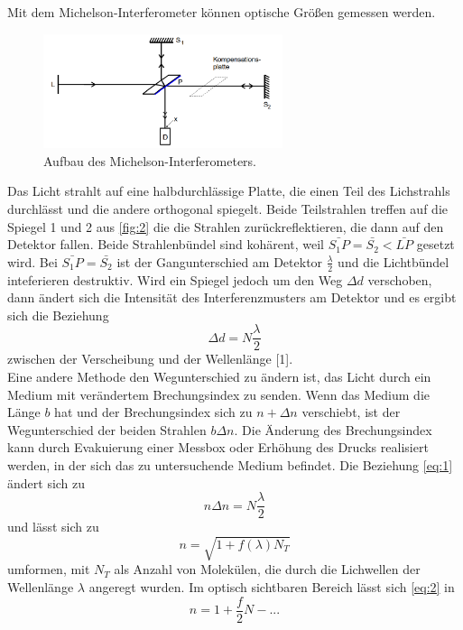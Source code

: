 Mit dem Michelson-Interferometer können optische Größen gemessen werden. 
\begin{figure}[H]
  \centering
  \includegraphics[width=7cm]{content/2}
  \caption{Aufbau des Michelson-Interferometers. \cite{sample}}
  \label{fig:2}
\end{figure}
Das Licht strahlt auf eine halbdurchlässige Platte, die einen Teil des Lichstrahls durchlässt und die andere orthogonal spiegelt. Beide Teilstrahlen treffen auf die Spiegel 1 und 2 aus \autoref{fig:2} die die Strahlen zurückreflektieren, die dann auf den Detektor fallen. Beide Strahlenbündel sind kohärent, weil $\bar{S_{1}P}=\bar{S_{2}}<\bar{LP}$ gesetzt wird. Bei $\bar{S_{1}P}=\bar{S_{2}}$ ist der Gangunterschied am Detektor $\frac{\lambda}{2}$ und die Lichtbündel inteferieren destruktiv. Wird ein Spiegel jedoch um den Weg $\Delta d$ verschoben, dann ändert sich die Intensität des Interferenzmusters am Detektor und es ergibt sich die Beziehung
\begin{equation}
  \Delta d=N\frac{\lambda}{2}
  \label{eq:deltad}
\end{equation}
zwischen der Verscheibung und der Wellenlänge [1].\\
Eine andere Methode den Wegunterschied zu ändern ist, das Licht durch ein Medium mit verändertem Brechungsindex zu senden. Wenn das Medium die Länge $b$ hat und der Brechungsindex sich zu $n+\Delta n$ verschiebt, ist der Wegunterschied der beiden Strahlen $b\Delta n$. Die Änderung des Brechungsindex kann durch Evakuierung einer Messbox oder Erhöhung des Drucks realisiert werden, in der sich das zu untersuchende Medium befindet. Die Beziehung \eqref{eq:1} ändert sich zu
\begin{equation}
  n\Delta n =N\frac{\lambda}{2} \nonumber
\end{equation}
und lässt sich zu 
\begin{equation}
  n=\sqrt{1+f(\lambda)N_{T}}
  \label{eq:2}
\end{equation}
umformen, mit $N_{T}$ als Anzahl von Molekülen, die durch die Lichwellen der Wellenlänge $\lambda$ angeregt wurden. Im optisch sichtbaren Bereich lässt sich \eqref{eq:2} in
\begin{equation}
  n=1+\frac{f}{2}N-... \nonumber
\end{equation}
